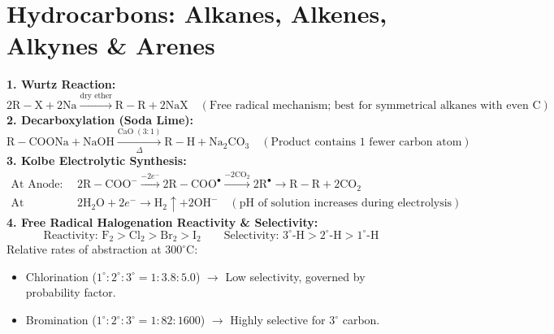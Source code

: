 \documentclass[10pt,a4paper]{article}
\begin{document}
\section{Hydrocarbons: Alkanes, Alkenes, Alkynes \& Arenes}

\begin{formulabox}
\textbf{1. Wurtz Reaction:}
\begin{equation}
  2\mathrm{R-X} + 2\mathrm{Na} \xrightarrow{\text{dry ether}} \mathrm{R-R} + 2\mathrm{NaX} \quad (\text{Free radical mechanism; best for symmetrical alkanes with even C})
\end{equation}
\textbf{2. Decarboxylation (Soda Lime):}
\begin{equation}
  \mathrm{R-COONa} + \mathrm{NaOH} \xrightarrow[\Delta]{\mathrm{CaO}\; (3:1)} \mathrm{R-H} + \mathrm{Na_2CO_3} \quad (\text{Product contains } 1 \text{ fewer carbon atom})
\end{equation}
\textbf{3. Kolbe Electrolytic Synthesis:}
\begin{align*}
  \text{At Anode: } & 2\mathrm{R-COO}^- \xrightarrow{-2e^-} 2\mathrm{R-COO}^\bullet \xrightarrow{-2\mathrm{CO}_2} 2\mathrm{R}^\bullet \to \mathrm{R-R} + 2\mathrm{CO}_2\\
  \text{At Cathode: } & 2\mathrm{H_2O} + 2e^- \to \mathrm{H}_2 \uparrow + 2\mathrm{OH}^- \quad (\mathrm{pH} \text{ of solution increases during electrolysis})
\end{align*}
\textbf{4. Free Radical Halogenation Reactivity \& Selectivity:}
\begin{equation}
  \text{Reactivity: } \mathrm{F}_2 > \mathrm{Cl}_2 > \mathrm{Br}_2 > \mathrm{I}_2 \qquad \text{Selectivity: } 3^\circ\text{-H} > 2^\circ\text{-H} > 1^\circ\text{-H}
\end{equation}
Relative rates of abstraction at $300^\circ\mathrm{C}$:
\begin{itemize}
  \item Chlorination ($1^\circ : 2^\circ : 3^\circ = 1 : 3.8 : 5.0$) $\to$ Low selectivity, governed by probability factor.
  \item Bromination ($1^\circ : 2^\circ : 3^\circ = 1 : 82 : 1600$) $\to$ Highly selective for $3^\circ$ carbon.
\end{itemize}
\end{formulabox}
\end{document}
